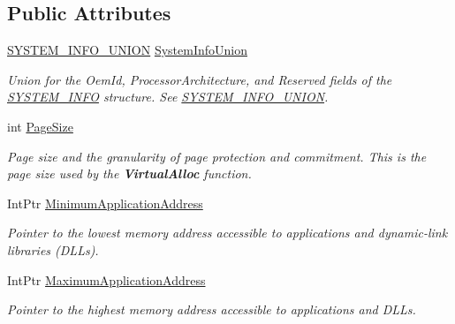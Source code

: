 \subsection*{Public Attributes}
\begin{DoxyCompactItemize}
\item 
\hyperlink{struct_tao_1_1_platform_1_1_windows_1_1_kernel_1_1_s_y_s_t_e_m___i_n_f_o___u_n_i_o_n}{SYSTEM\_\-INFO\_\-UNION} \hyperlink{struct_tao_1_1_platform_1_1_windows_1_1_kernel_1_1_s_y_s_t_e_m___i_n_f_o_a6e86574f6bf20eeb3067718c06c919ad}{SystemInfoUnion}
\begin{DoxyCompactList}\small\item\em Union for the OemId, ProcessorArchitecture, and Reserved fields of the \hyperlink{struct_tao_1_1_platform_1_1_windows_1_1_kernel_1_1_s_y_s_t_e_m___i_n_f_o}{SYSTEM\_\-INFO} structure. See \hyperlink{struct_tao_1_1_platform_1_1_windows_1_1_kernel_1_1_s_y_s_t_e_m___i_n_f_o___u_n_i_o_n}{SYSTEM\_\-INFO\_\-UNION}. \item\end{DoxyCompactList}\item 
int \hyperlink{struct_tao_1_1_platform_1_1_windows_1_1_kernel_1_1_s_y_s_t_e_m___i_n_f_o_a5c72c40ccfdf4070f7ed58033db8c892}{PageSize}
\begin{DoxyCompactList}\small\item\em Page size and the granularity of page protection and commitment. This is the page size used by the {\bfseries VirtualAlloc} function. \item\end{DoxyCompactList}\item 
IntPtr \hyperlink{struct_tao_1_1_platform_1_1_windows_1_1_kernel_1_1_s_y_s_t_e_m___i_n_f_o_a0f0c6aa8c394aed872e003895c045ee3}{MinimumApplicationAddress}
\begin{DoxyCompactList}\small\item\em Pointer to the lowest memory address accessible to applications and dynamic-\/link libraries (DLLs). \item\end{DoxyCompactList}\item 
IntPtr \hyperlink{struct_tao_1_1_platform_1_1_windows_1_1_kernel_1_1_s_y_s_t_e_m___i_n_f_o_a28e5d33f7be1fc703b3021c7175c1d3b}{MaximumApplicationAddress}
\begin{DoxyCompactList}\small\item\em Pointer to the highest memory address accessible to applications and DLLs. \item\end{DoxyCompactList}\item 

\end{DoxyCompactItemize}
